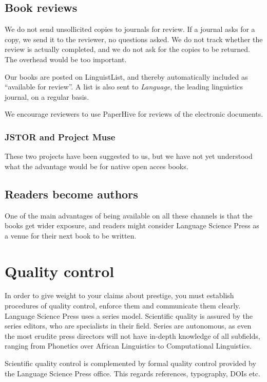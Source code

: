 \documentclass[guidelines,nonflat,modfonts] {langsci/langscibook}
\begin{document}
\subsection{Book reviews}
We do not send unsollicited copies to journals for review. If a journal asks for a copy, we send it to the reviewer, no questions asked. We do not track whether the review is actually completed, and we do not ask for the copies to be returned. The overhead would be too important. 

Our books are posted on LinguistList, and thereby automatically included as ``available for review''. A list is also sent to \textit{Language}, the leading linguistics journal, on a regular basis. 

We encourage reviewers to use PaperHive for reviews of the electronic documents.

                      
\subsubsection{JSTOR and Project Muse}                      
These two projects have been suggested to us, but we have not yet understood what the advantage would be for native open acces books.


\subsection{Readers become authors}
One of the main advantages of being available on all these channels is that the books get wider exposure, and readers might consider Language Science Press as a venue for their next book to be written. %

\section{Quality control}\label{sec:qualitycontrol}
In order to give weight to your claims about prestige, you must establish procedures of quality control, enforce them and communicate them clearly. Language Science Press uses a series model. Scientific quality is assured by the series editors, who are specialists in their field. Series are autonomous, as even the most erudite press directors will not have in-depth knowledge of all subfields, ranging from Phonetics over African Linguistics to Computational Linguistics. 

Scientific quality control is complemented by formal quality control provided by the Language Science Press office. This regards references, typography, DOIs etc. 
\end{document}
